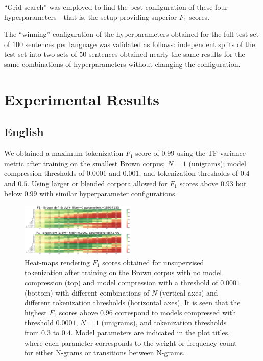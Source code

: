 \documentclass[11pt]{article}
\begin{document}
 “Grid search” was employed to find the best configuration of these four hyperparameters—that is, the setup providing superior $F_1$ scores.

The “winning” configuration of the hyperparameters obtained for the full test set of $100$ sentences per language was validated as follows: independent splits of the test set into two sets of $50$ sentences obtained nearly the same results for the same combinations of hyperparameters without changing the configuration.

\section{Experimental Results}

\subsection{\label{41}English}

We obtained a maximum tokenization $F_1$ score of $0.99$ using the TF variance metric after training on the smallest Brown corpus; $N=1$ (unigrams); model compression thresholds of $0.0001$ and $0.001$; and tokenization thresholds of $0.4$ and $0.5$.  Using larger or blended corpora allowed for $F_1$ scores above $0.93$ but below $0.99$ with similar hyperparameter configurations.

\begin{figure}
  \includegraphics[width=0.49\textwidth]{imgs/figure6.png}
  \caption{Heat-maps rendering $F_1$ scores obtained for unsupervised tokenization after training on the Brown corpus with no model compression (top) and model compression with a threshold of $0.0001$ (bottom) with different combinations of $N$ (vertical axes) and different tokenization thresholds (horizontal axes). It is seen that the highest $F_1$ scores above $0.96$ correspond to models compressed with threshold $0.0001$, $N=1$ (unigrams), and tokenization thresholds from $0.3$ to $0.4$. Model parameters are indicated in the plot titles, where each parameter corresponds to the weight or frequency count for either N-grams or transitions between N-grams.}
\end{figure}
\end{document}
